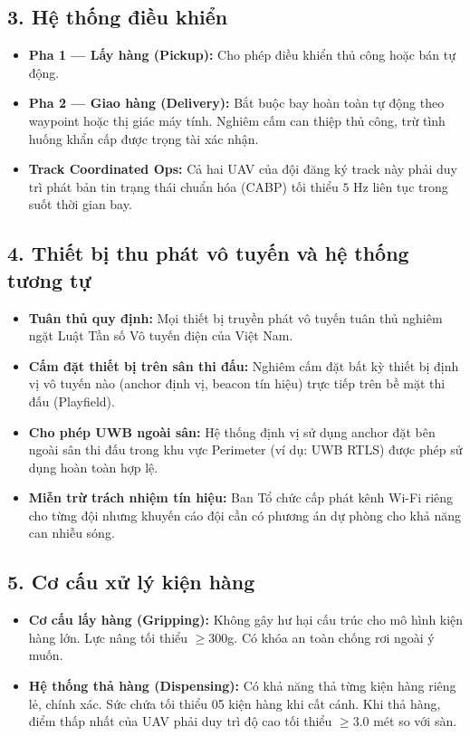 \documentclass[12pt,a4paper]{article}
\begin{document}
\subsection*{3. Hệ thống điều khiển}
\begin{itemize}
\item \textbf{Pha 1 — Lấy hàng (Pickup):} Cho phép điều khiển thủ công hoặc bán tự động.
\item \textbf{Pha 2 — Giao hàng (Delivery):} Bắt buộc bay hoàn toàn tự động theo waypoint hoặc thị giác máy tính. Nghiêm cấm can thiệp thủ công, trừ tình huống khẩn cấp được trọng tài xác nhận.
\item \textbf{Track Coordinated Ops:} Cả hai UAV của đội đăng ký track này phải duy trì phát bản tin trạng thái chuẩn hóa (CABP) tối thiểu $5\text{ Hz}$ liên tục trong suốt thời gian bay.
\end{itemize}

\subsection*{4. Thiết bị thu phát vô tuyến và hệ thống tương tự}
\begin{itemize}
\item \textbf{Tuân thủ quy định:} Mọi thiết bị truyền phát vô tuyến tuân thủ nghiêm ngặt Luật Tần số Vô tuyến điện của Việt Nam.
\item \textbf{Cấm đặt thiết bị trên sân thi đấu:} Nghiêm cấm đặt bất kỳ thiết bị định vị vô tuyến nào (anchor định vị, beacon tín hiệu) trực tiếp trên bề mặt thi đấu (Playfield).
\item \textbf{Cho phép UWB ngoài sân:} Hệ thống định vị sử dụng anchor đặt bên ngoài sân thi đấu trong khu vực Perimeter (ví dụ: UWB RTLS) được phép sử dụng hoàn toàn hợp lệ.
\item \textbf{Miễn trừ trách nhiệm tín hiệu:} Ban Tổ chức cấp phát kênh Wi-Fi riêng cho từng đội nhưng khuyến cáo đội cần có phương án dự phòng cho khả năng can nhiễu sóng.
\end{itemize}

\subsection*{5. Cơ cấu xử lý kiện hàng}
\begin{itemize}
\item \textbf{Cơ cấu lấy hàng (Gripping):} Không gây hư hại cấu trúc cho mô hình kiện hàng lớn. Lực nâng tối thiểu $\geq 300$g. Có khóa an toàn chống rơi ngoài ý muốn.
\item \textbf{Hệ thống thả hàng (Dispensing):} Có khả năng thả từng kiện hàng riêng lẻ, chính xác. Sức chứa tối thiểu 05 kiện hàng khi cất cánh. Khi thả hàng, điểm thấp nhất của UAV phải duy trì độ cao tối thiểu $\geq 3.0$ mét so với sàn.
\end{itemize}
\end{document}
